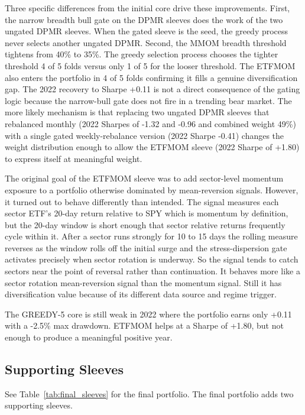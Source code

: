 \documentclass{article}
\begin{document}
Three specific differences from the initial core drive these improvements. First, the narrow breadth bull gate on the DPMR sleeves does the work of the two ungated DPMR sleeves. When the gated sleeve is the seed, the greedy process never selects another ungated DPMR. Second, the MMOM breadth threshold tightens from 40\% to 35\%. The greedy selection process chooses the tighter threshold 4 of 5 folds versus only 1 of 5 for the looser threshold. The ETFMOM also enters the portfolio in 4 of 5 folds confirming it fills a genuine diversification gap. The 2022 recovery to Sharpe +0.11 is not a direct consequence of the gating logic because the narrow-bull gate does not fire in a trending bear market. The more likely mechanism is that replacing two ungated DPMR sleeves that rebalanced monthly (2022 Sharpes of -1.32 and -0.96 and combined weight 49\%) with a single gated weekly-rebalance version (2022 Sharpe -0.41) changes the weight distribution enough to allow the ETFMOM sleeve (2022 Sharpe of +1.80) to express itself at meaningful weight.

The original goal of the ETFMOM sleeve was to add sector-level momentum exposure to a portfolio otherwise dominated by mean-reversion signals. However, it turned out to behave differently than intended. The signal measures each sector ETF's 20-day return relative to SPY which is momentum by definition, but the 20-day window is short enough that sector relative returns frequently cycle within it. After a sector runs strongly for 10 to 15 days the rolling measure reverses as the window rolls off the initial surge and the stress-dispersion gate activates precisely when sector rotation is underway. So the signal tends to catch sectors near the point of reversal rather than continuation. It behaves more like a sector rotation mean-reversion signal than the momentum signal. Still it has diversification value because of its different data source and regime trigger.

The GREEDY-5 core is still weak in 2022 where the portfolio earns only +0.11 with a -2.5\% max drawdown. ETFMOM helps at a Sharpe of +1.80, but not enough to produce a meaningful positive year.

\subsection{Supporting Sleeves}

See Table~\ref{tab:final_sleeves} for the final portfolio. The final portfolio adds two supporting sleeves.
\end{document}
